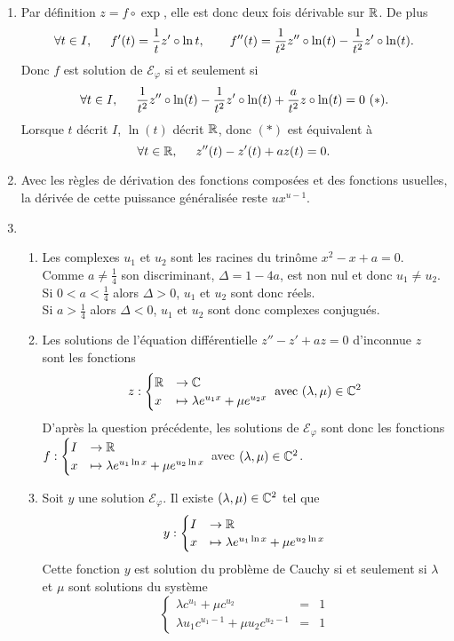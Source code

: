 \begin{enumerate}
\begin{enumerate}
\end{enumerate}
\item Par définition $z=f\circ \exp$, elle est donc deux fois dérivable sur $\mathbb{R}$. De plus 
\[
  \forall t\in I,\hspace{0.5cm} f'(t) = \frac 1t z'\circ \ln t, \qquad f''(t) = \frac 1{t^2}z''\circ \ln (t)-\frac 1{t^2}z'\circ \ln (t).
\]
Donc $f$ est solution de $\mathcal E_\varphi$ si et seulement si
\[
\forall t\in I,\hspace{0.5cm} \frac 1{t^2}z''\circ \ln (t)-\frac 1{t^2}z'\circ \ln (t)+\frac a{t^2}z\circ \ln (t)=0\ (*).
\]
Lorsque $t$ décrit $I$, $\ln(t)$ décrit $\mathbb{R}$, donc $(*)$ est équivalent à 
\[
\forall t\in\mathbb{R},\hspace{0.5cm} z''(t)-z'(t) + az(t) = 0 .\]

\item Avec les règles de dérivation des fonctions composées et des fonctions usuelles, la dérivée de cette puissance généralisée reste $ux^{u-1}$. 

\item 
\begin{enumerate}
\item 
Les complexes $u_1$ et $u_2$ sont les racines du trinôme $x^2-x+a=0$. Comme $a\neq\frac 14$ son discriminant, $\Delta=1-4a$, est non nul et donc $u_1\neq u_2$.\\
Si $0<a<\frac 14$ alors $\Delta>0$, $u_1$ et $u_2$ sont donc réels.\\
Si $a>\frac 14$ alors $\Delta<0$, $u_1$ et $u_2$ sont donc complexes conjugués.

\item Les solutions de l'équation différentielle $z''  - z' + az = 0$ d'inconnue $z$ sont les fonctions
\begin{displaymath}
z : \begin{cases}\mathbb{R} &\rightarrow \mathbb{C} \\ x &\mapsto \lambda e^{u_1 x}+\mu e^{u_2 x} \end{cases}\text{ avec }(\lambda,\mu)\in\mathbb{C}^2  
\end{displaymath}
D'après la question précédente, les solutions de $\mathcal E_\varphi$ sont donc les fonctions 
$f : \begin{cases}I &\rightarrow \mathbb{R} \\ x &\mapsto \lambda e^{u_1 \ln x}+\mu e^{u_2 \ln x} \end{cases}$ avec $(\lambda,\mu)\in\mathbb{C}^2$.

\item Soit $y$ une solution $\mathcal E_\varphi$. Il existe $(\lambda,\mu)\in\mathbb{C}^2$ tel que
\[
 y : \begin{cases}I &\rightarrow \mathbb{R} \\ x &\mapsto \lambda e^{u_1 \ln x}+\mu e^{u_2 \ln x} \end{cases} 
\]
Cette fonction $y$ est solution du problème de Cauchy si et seulement si $\lambda$ et $\mu$ sont solutions du système 
\[
\left\{\begin{array}{lll}
\lambda c^{u_1}+\mu c^{u_2}&=&1\\
\lambda u_1c^{u_1-1}+\mu u_2c^{u_2-1}&=&1
\end{array}\right.
\]


\end{enumerate}
\end{enumerate}
